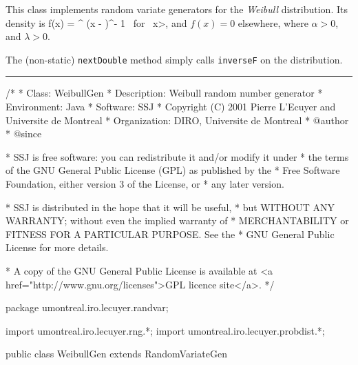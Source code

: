 
This class implements random variate generators for the 
{\em Weibull\/} distribution. Its density is
\eq
   f(x) = \alpha\lambda^{\alpha} (x - \delta)^{\alpha - 1}
          \qquad\mbox{ for }  x>\delta,   
\endeq
and $f(x)=0$ elsewhere, where $\alpha > 0$, and $\lambda > 0$.

The (non-static) \texttt{nextDouble} method simply calls \texttt{inverseF} on the
distribution.

\bigskip\hrule

\begin{code}
\begin{hide}
/*
 * Class:        WeibullGen
 * Description:  Weibull random number generator
 * Environment:  Java
 * Software:     SSJ 
 * Copyright (C) 2001  Pierre L'Ecuyer and Universite de Montreal
 * Organization: DIRO, Universite de Montreal
 * @author       
 * @since

 * SSJ is free software: you can redistribute it and/or modify it under
 * the terms of the GNU General Public License (GPL) as published by the
 * Free Software Foundation, either version 3 of the License, or
 * any later version.

 * SSJ is distributed in the hope that it will be useful,
 * but WITHOUT ANY WARRANTY; without even the implied warranty of
 * MERCHANTABILITY or FITNESS FOR A PARTICULAR PURPOSE.  See the
 * GNU General Public License for more details.

 * A copy of the GNU General Public License is available at
   <a href="http://www.gnu.org/licenses">GPL licence site</a>.
 */
\end{hide}
package umontreal.iro.lecuyer.randvar;\begin{hide}
import umontreal.iro.lecuyer.rng.*;
import umontreal.iro.lecuyer.probdist.*;
\end{hide}

public class WeibullGen extends RandomVariateGen \begin{hide} {
   private double alpha = -1.0;
   private double lambda = -1.0;
   private double delta = -1.0;
\end{hide}\end{code}


